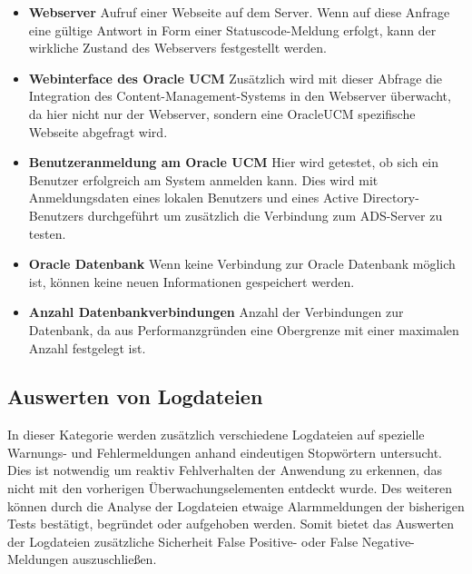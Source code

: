 \begin{itemize}
\item \textbf{Webserver} Aufruf einer Webseite auf dem Server. Wenn auf diese Anfrage eine gültige Antwort in Form einer Statuscode-Meldung erfolgt, kann der wirkliche Zustand des Webservers festgestellt werden.

\item \textbf{Webinterface des Oracle UCM} Zusätzlich wird mit dieser Abfrage die Integration des Content-Management-Systems in den Webserver überwacht, da hier nicht nur der Webserver, sondern eine \gls{OracleUCM} spezifische Webseite abgefragt wird.

\item \textbf{Benutzeranmeldung am Oracle UCM} Hier wird getestet, ob sich ein Benutzer erfolgreich am System anmelden kann.
Dies wird mit Anmeldungsdaten eines lokalen Benutzers und eines Active Directory-Benutzers durchgeführt um zusätzlich die Verbindung zum ADS-Server zu testen.

\item \textbf{Oracle Datenbank} Wenn keine Verbindung zur Oracle Datenbank möglich ist, können keine neuen Informationen gespeichert werden. 


\item \textbf{Anzahl Datenbankverbindungen} Anzahl der Verbindungen zur Datenbank, da aus Performanzgründen eine Obergrenze mit einer maximalen Anzahl festgelegt ist.
\end{itemize}

\subsection{Auswerten von Logdateien}
\label{checklog}
In dieser Kategorie werden zusätzlich verschiedene Logdateien auf spezielle Warnungs- und Fehlermeldungen anhand eindeutigen Stopwörtern untersucht.
Dies ist notwendig um reaktiv Fehlverhalten der Anwendung zu erkennen, das nicht mit den vorherigen Überwachungselementen entdeckt wurde.
Des weiteren können durch die Analyse der Logdateien etwaige Alarmmeldungen der bisherigen Tests bestätigt, begründet oder aufgehoben werden.
Somit bietet das Auswerten der Logdateien zusätzliche Sicherheit False Positive- oder False Negative-Meldungen auszuschließen.

